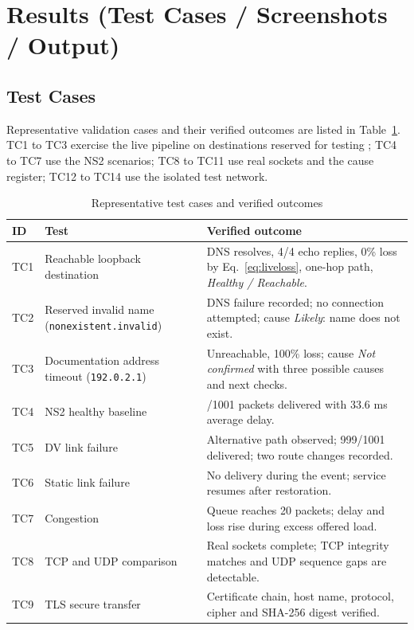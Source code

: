 \documentclass[12pt,a4paper]{report}
\numberwithin{equation}{chapter}
\newcommand{\tighttable}{\renewcommand{\arraystretch}{1.18}}
\begin{document}
\section{Results (Test Cases / Screenshots / Output)}
\subsection{Test Cases}
Representative validation cases and their verified outcomes are listed in Table~\ref{tab:testcases}. TC1 to TC3 exercise the live pipeline on destinations reserved for testing \cite{rfc5737,rfc6761}; TC4 to TC7 use the NS2 scenarios; TC8 to TC11 use real sockets and the cause register; TC12 to TC14 use the isolated test network.

\begin{table}[H]
\centering
\caption{Representative test cases and verified outcomes}
\label{tab:testcases}
\tighttable
\begin{tabularx}{\textwidth}{p{}>{\raggedright\arraybackslash}p{}>{\raggedright\arraybackslash}X}
\toprule
\textbf{ID} & \textbf{Test} & \textbf{Verified outcome}\\
\midrule
TC1 & Reachable loopback destination & DNS resolves, 4/4 echo replies, 0\% loss by Eq.~\eqref{eq:liveloss}, one-hop path, \emph{Healthy / Reachable}.\\
TC2 & Reserved invalid name (\nolinkurl{nonexistent.invalid}) & DNS failure recorded; no connection attempted; cause \emph{Likely}: name does not exist.\\
TC3 & Documentation address timeout (\texttt{192.0.2.1}) & Unreachable, 100\% loss; cause \emph{Not confirmed} with three possible causes and next checks.\\
TC4 & NS2 healthy baseline & 1001/1001 packets delivered with 33.6 ms average delay.\\
TC5 & DV link failure & Alternative path observed; 999/1001 delivered; two route changes recorded.\\
TC6 & Static link failure & No delivery during the event; service resumes after restoration.\\
TC7 & Congestion & Queue reaches 20 packets; delay and loss rise during excess offered load.\\
TC8 & TCP and UDP comparison & Real sockets complete; TCP integrity matches and UDP sequence gaps are detectable.\\
TC9 & TLS secure transfer & Certificate chain, host name, protocol, cipher and SHA-256 digest verified.\\

\end{tabularx}
\end{table}
\end{document}
